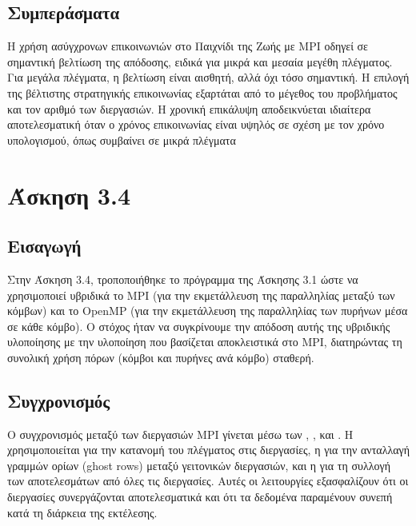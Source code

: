 \documentclass{article}
\begin{document}
\subsection*{Συμπεράσματα}
Η χρήση ασύγχρονων επικοινωνιών στο Παιχνίδι της Ζωής με MPI οδηγεί σε σημαντική βελτίωση της απόδοσης, ειδικά για μικρά και μεσαία μεγέθη πλέγματος. Για μεγάλα πλέγματα, η βελτίωση είναι αισθητή, αλλά όχι τόσο σημαντική. Η επιλογή της βέλτιστης στρατηγικής επικοινωνίας εξαρτάται από το μέγεθος του προβλήματος και τον αριθμό των διεργασιών. Η χρονική επικάλυψη αποδεικνύεται ιδιαίτερα αποτελεσματική όταν ο χρόνος επικοινωνίας είναι υψηλός σε σχέση με τον χρόνο υπολογισμού, όπως συμβαίνει σε μικρά πλέγματα
\section*{Άσκηση 3.4}
\subsection*{Εισαγωγή}
Στην Άσκηση 3.4, τροποποιήθηκε το πρόγραμμα της Άσκησης 3.1 ώστε να χρησιμοποιεί υβριδικά το MPI (για την εκμετάλλευση της παραλληλίας μεταξύ των κόμβων) και το OpenMP (για την εκμετάλλευση της παραλληλίας των πυρήνων μέσα σε κάθε κόμβο). Ο στόχος ήταν να συγκρίνουμε την απόδοση αυτής της υβριδικής υλοποίησης με την υλοποίηση που βασίζεται αποκλειστικά στο MPI, διατηρώντας τη συνολική χρήση πόρων (κόμβοι και πυρήνες ανά κόμβο) σταθερή.
\subsection*{Συγχρονισμός}
Ο συγχρονισμός μεταξύ των διεργασιών MPI γίνεται μέσω των \texttt{}, \texttt{}, και \texttt{}. Η \texttt{} χρησιμοποιείται για την κατανομή του πλέγματος στις διεργασίες, η \texttt{} για την ανταλλαγή γραμμών ορίων (ghost rows) μεταξύ γειτονικών διεργασιών, και η \texttt{} για τη συλλογή των αποτελεσμάτων από όλες τις διεργασίες. Αυτές οι λειτουργίες εξασφαλίζουν ότι οι διεργασίες συνεργάζονται αποτελεσματικά και ότι τα δεδομένα παραμένουν συνεπή κατά τη διάρκεια της εκτέλεσης.
\end{document}

